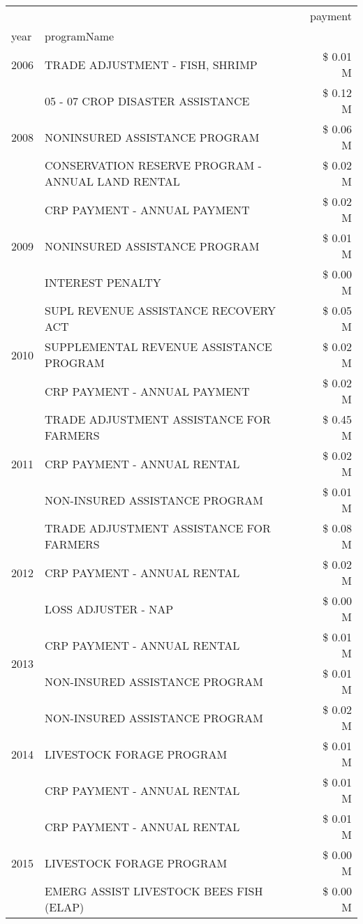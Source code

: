 \begin{tabular}{llr}
\toprule
 &  & payment \\
year & programName &  \\
\midrule
2006 & TRADE ADJUSTMENT - FISH, SHRIMP & \$ 0.01 M \\
\cline{1-3}
\multirow[t]{3}{*}{2008} & 05 - 07 CROP DISASTER ASSISTANCE & \$ 0.12 M \\
 & NONINSURED ASSISTANCE PROGRAM & \$ 0.06 M \\
 & CONSERVATION RESERVE PROGRAM - ANNUAL LAND RENTAL & \$ 0.02 M \\
\cline{1-3}
\multirow[t]{3}{*}{2009} & CRP PAYMENT - ANNUAL PAYMENT & \$ 0.02 M \\
 & NONINSURED ASSISTANCE PROGRAM & \$ 0.01 M \\
 & INTEREST PENALTY & \$ 0.00 M \\
\cline{1-3}
\multirow[t]{3}{*}{2010} & SUPL REVENUE ASSISTANCE RECOVERY ACT & \$ 0.05 M \\
 & SUPPLEMENTAL REVENUE ASSISTANCE PROGRAM & \$ 0.02 M \\
 & CRP PAYMENT - ANNUAL PAYMENT & \$ 0.02 M \\
\cline{1-3}
\multirow[t]{3}{*}{2011} & TRADE ADJUSTMENT ASSISTANCE FOR FARMERS & \$ 0.45 M \\
 & CRP PAYMENT - ANNUAL RENTAL & \$ 0.02 M \\
 & NON-INSURED ASSISTANCE PROGRAM & \$ 0.01 M \\
\cline{1-3}
\multirow[t]{3}{*}{2012} & TRADE ADJUSTMENT ASSISTANCE FOR FARMERS & \$ 0.08 M \\
 & CRP PAYMENT - ANNUAL RENTAL & \$ 0.02 M \\
 & LOSS ADJUSTER - NAP & \$ 0.00 M \\
\cline{1-3}
\multirow[t]{2}{*}{2013} & CRP PAYMENT - ANNUAL RENTAL & \$ 0.01 M \\
 & NON-INSURED ASSISTANCE PROGRAM & \$ 0.01 M \\
\cline{1-3}
\multirow[t]{3}{*}{2014} & NON-INSURED ASSISTANCE PROGRAM & \$ 0.02 M \\
 & LIVESTOCK FORAGE PROGRAM & \$ 0.01 M \\
 & CRP PAYMENT - ANNUAL RENTAL & \$ 0.01 M \\
\cline{1-3}
\multirow[t]{3}{*}{2015} & CRP PAYMENT - ANNUAL RENTAL & \$ 0.01 M \\
 & LIVESTOCK FORAGE PROGRAM & \$ 0.00 M \\
 & EMERG ASSIST LIVESTOCK BEES FISH (ELAP) & \$ 0.00 M \\

\end{tabular}
